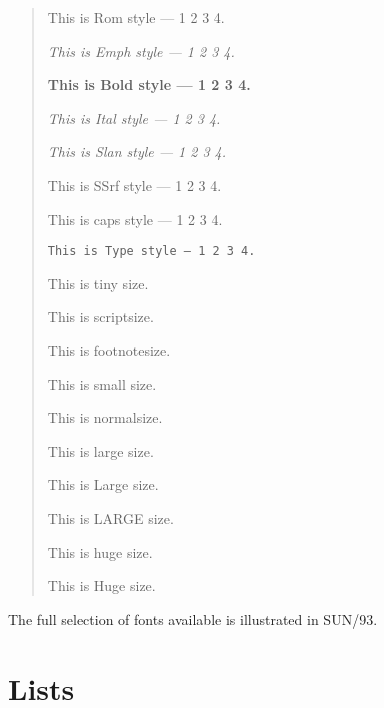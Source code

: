 \begin{quote}

{\rm This is Rom style --- 1 2 3 4.}

{\em This is Emph style --- 1 2 3 4.}

{\bf This is Bold style --- 1 2 3 4.}

{\it This is Ital style --- 1 2 3 4.}

{\sl This is Slan style --- 1 2 3 4.}

{\sf This is SSrf style --- 1 2 3 4.}

{\sc This is caps style --- 1 2 3 4.}

{\tt This is Type style --- 1 2 3 4.}

{\tiny This is tiny size.}

{\scriptsize This is scriptsize.}

{\footnotesize This is footnotesize.}

{\small This is small size.}

{\normalsize This is normalsize.}

{\large This is large size.}

{\Large This is Large size.}

{\LARGE This is LARGE size.}

{\huge This is huge size.}

{\Huge This is Huge size.}

\end{quote}

\vspace{10mm}

The full selection of fonts available is illustrated in SUN/93.

\newpage

\section{Lists}

